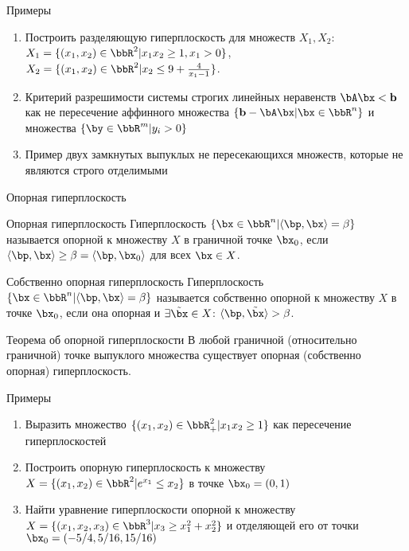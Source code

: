 \documentclass[12pt]{beamer}
\begin{document}
\begin{frame}{Примеры}
\begin{enumerate}
\item Построить разделяющую гиперплоскость для множеств $X_1, X_2$: $X_1 = \{ (x_1, x_2) \in \bbR^2 | x_1x_2 \geq 1, x_1 > 0 \}$, $X_2 = \{ (x_1, x_2) \in \bbR^2 |  x_2 \leq 9 + \frac{4}{x_1 - 1} \}$.
\item Критерий разрешимости системы строгих линейных неравенств $\bA\bx < \mathbf{b}$ как не пересечение аффинного множества $\{\mathbf{b} - \bA\bx | \bx \in \bbR^n \}$ и множества $\{ \by \in \bbR^m | y_i > 0 \}$ 
\item Пример двух замкнутых выпуклых не пересекающихся множеств, которые не являются строго отделимыми
\end{enumerate}
\end{frame}

\begin{frame}{Опорная гиперплоскость}
\begin{block}{Опорная гиперплоскость}
Гиперплоскость $\{ \bx \in \bbR^n | \langle \bp, \bx \rangle = \beta \}$ называется опорной к множеству $X$ в граничной точке $\bx_0$, если $\langle \bp, \bx \rangle \geq \beta = \langle \bp, \bx_0 \rangle$ для всех $\bx \in X$.
\end{block}

\begin{block}{Собственно опорная гиперплоскость}
Гиперплоскость $\{ \bx \in \bbR^n | \langle \bp, \bx \rangle = \beta \}$ называется собственно опорной к множеству $X$ в точке $\bx_0$, если она опорная и $\exists \tilde{\bx} \in X$: $\langle \bp, \tilde{\bx} \rangle > \beta$.
\end{block}

\begin{block}{Теорема об опорной гиперплоскости}
В любой граничной (относительно граничной) точке выпуклого множества существует опорная (собственно опорная) гиперплоскость.
\end{block}
\end{frame}


\begin{frame}{Примеры}
\begin{enumerate}
\item Выразить множество $\{ (x_1, x_2) \in \bbR_+^2| x_1x_2 \geq 1\}$ как пересечение гиперплоскостей
\item Построить опорную гиперплоскость к множеству $X = \{ (x_1, x_2) \in \bbR^2 | e^{x_1} \leq x_2 \}$ в точке $\bx_0 = (0, 1)$
\item Найти уравнение гиперплоскости опорной к множеству $X = \{ (x_1, x_2, x_3) \in \bbR^3 | x_3 \geq x_1^2 + x_2^2 \}$ и отделяющей его от точки $\bx_0 = (-5/4, 5 / 16, 15/16)$
\end{enumerate}
\end{frame}
\end{document}
